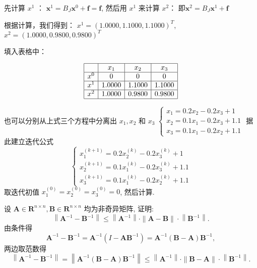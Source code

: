 \begin{tcolorbox}[enhanced,colback=10,colframe=9,breakable,coltitle=green!25!black,title=2024]
先计算 $x^{1}$ ： $\boldsymbol{x}^{1} = B_J \boldsymbol{x}^{0} + \boldsymbol{f} = \boldsymbol{f}$, 然后用 $x^{1}$ 来计算 $x^{2}$：
即$\boldsymbol{x}^{2} = B_J \boldsymbol{x}^{1} + \boldsymbol{f}$

根据计算，我们得到： $x^{1} = (1.0000, 1.1000, 1.1000)^T$, $x^{2} = (1.0000, 0.9800, 0.9800)^T$

填入表格中：

$$
\begin{array}{|c|c|c|c|}
\hline & x_1 & x_2 & x_3 \\
\hline x^{0} & 0 & 0 & 0 \\
\hline x^{1} & 1.0000 & 1.1000 & 1.1000 \\
\hline x^{2} & 1.0000 & 0.9800 & 0.9800 \\
\hline
\end{array}
$$




也可以分别从上式三个方程中分离出 $ x_{1}, x_{2} $ 和 $ x_{3} $
$
\left\{\begin{array}{l}
x_{1}=0.2 x_{2}-0.2 x_{3}+1 \\
x_{2}=0.1 x_{1}-0.2 x_{3}+1.1 \\
x_{3}=0.1 x_{1}-0.2 x_{2}+1.1
\end{array}\right.
$
据此建立迭代公式
$$
\left\{\begin{array}{l}
x_{1}^{(k+1)}=0.2 x_{2}^{(k)}-0.2 x_{3}^{(k)}+1\\
x_{2}^{(k+1)}=0.1 x_{1}^{(k)}-0.2 x_{3}^{(k)}+1.1 \\
x_{3}^{(k+1)}=0.1 x_{1}^{(k)}-0.2 x_{2}^{(k)}+1.1
\end{array}\right.
$$
取迭代初值 $ x_{1}^{(0)}=x_{2}^{(0)}=x_{3}^{(0)}=0 $, 然后计算.
\end{tcolorbox}

\begin{tcolorbox}[enhanced,colback=10,colframe=9,breakable,coltitle=green!25!black,title=2024]
 设 $ \boldsymbol{A} \in \mathbf{R}^{n \times n}, \boldsymbol{B} \in \mathbf{R}^{n \times n} $ 均为非奇异矩阵, 证明:
$$
\left\|\boldsymbol{A}^{-1}-\boldsymbol{B}^{-1}\right\| \leqslant\left\|\boldsymbol{A}^{-1}\right\| \cdot\|\boldsymbol{A}-\boldsymbol{B}\| \cdot\left\|\boldsymbol{B}^{-1}\right\| .
$$
 \tcblower
由条件得
$$
\boldsymbol{A}^{-1}-\boldsymbol{B}^{-1}=\boldsymbol{A}^{-1}\left(I-\boldsymbol{A B}^{-1}\right)=\boldsymbol{A}^{-1}(\boldsymbol{B}-\boldsymbol{A}) \boldsymbol{B}^{-1},
$$
两边取范数得
$$
\left\|\boldsymbol{A}^{-1}-\boldsymbol{B}^{-1}\right\|=\left\|\boldsymbol{A}^{-1}(\boldsymbol{B}-\boldsymbol{A}) \boldsymbol{B}^{-1}\right\| \leqslant\left\|\boldsymbol{A}^{-1}\right\| \cdot\|\boldsymbol{B}-\boldsymbol{A}\| \cdot\left\|\boldsymbol{B}^{-1}\right\| .
$$
\end{tcolorbox}


